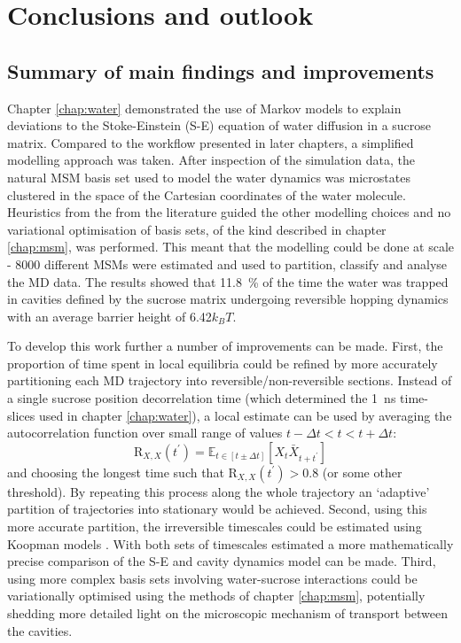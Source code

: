 \let\textcircled=\pgftextcircled
\chapter{Conclusions and outlook}
\label{chap:conclusions}


\section{Summary of main findings and improvements}
Chapter \ref{chap:water} demonstrated the use of Markov models to explain deviations to the Stoke-Einstein (S-E) equation of water diffusion in a sucrose matrix. Compared to the workflow presented in later chapters, a simplified modelling approach was taken.  After inspection of the simulation data, the natural MSM basis set used to model the water dynamics was microstates clustered in the space of the Cartesian coordinates of the water molecule.  Heuristics from the from the literature guided the other modelling choices and no variational optimisation of basis sets, of the kind described in chapter \ref{chap:msm}, was performed. This meant that the modelling could be done at scale - 8000 different MSMs were estimated and used to partition, classify and analyse the MD data. The results showed that \SI{11.8}{\percent} of the time the water was trapped in cavities defined by the sucrose matrix undergoing reversible hopping dynamics with an average barrier height of \num{6.42}$k_{B}T$. 

To develop this work further a number of improvements can be made. First, the proportion of time spent in local equilibria could be refined by more accurately partitioning each MD trajectory into reversible/non-reversible sections. Instead of a single sucrose position decorrelation time (which determined the \SI{1}{\nano\second} time-slices used in chapter \ref{chap:water}), a local estimate can be used by averaging the autocorrelation function over small range of values $t-\Delta t < t < t+\Delta t$:
\begin{equation}
\mathrm{R}_{X,  X}(t^{\prime})=\mathbb{E}_{t \in [t\pm\Delta t]}\left[X_{t} \bar{X}_{t+t^{\prime}}\right]
\end{equation}
and choosing the longest time such that $\mathrm{R}_{X,  X}(t^{\prime}) > 0.8$ (or some other threshold). By repeating this process along the whole trajectory an `adaptive' partition of trajectories into stationary would be achieved. Second, using this more accurate partition, the irreversible timescales could be estimated using Koopman models \cite{wuVariationalKoopmanModels2017}. With both sets of timescales estimated a more mathematically precise comparison of the S-E and cavity dynamics model can be made. Third, using more complex basis sets involving water-sucrose interactions could be variationally  optimised using the methods of chapter \ref{chap:msm}, potentially shedding more detailed light on the microscopic mechanism of transport between the cavities. 

